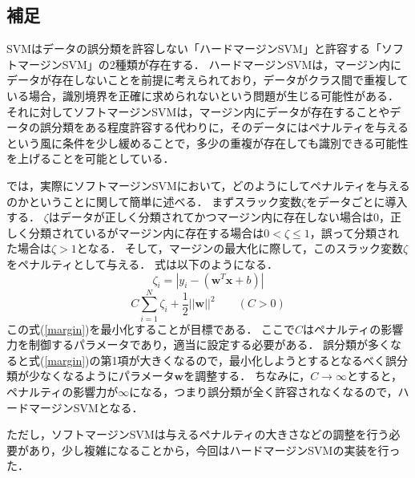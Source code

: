 \subsection*{補足}
SVMはデータの誤分類を許容しない「ハードマージンSVM」と許容する「ソフトマージンSVM」の2種類が存在する．
ハードマージンSVMは，マージン内にデータが存在しないことを前提に考えられており，データがクラス間で重複している場合，識別境界を正確に求められないという問題が生じる可能性がある．
それに対してソフトマージンSVMは，マージン内にデータが存在することやデータの誤分類をある程度許容する代わりに，そのデータにはペナルティを与えるという風に条件を少し緩めることで，多少の重複が存在しても識別できる可能性を上げることを可能としている．\par
では，実際にソフトマージンSVMにおいて，どのようにしてペナルティを与えるのかということに関して簡単に述べる．
まずスラック変数$\zeta$をデータごとに導入する．
$\zeta$はデータが正しく分類されてかつマージン内に存在しない場合は0，正しく分類されているがマージン内に存在する場合は$0<\zeta \leq 1$，誤って分類された場合は$\zeta>1$となる．
そして，マージンの最大化に際して，このスラック変数$\zeta$をペナルティとして与える．
式は以下のようになる．
\begin{equation}
    \zeta_i=|y_i-(\bm{w}^T\bm{x}+b)|
    \label{zeta}
\end{equation}
\begin{equation}
    C\sum_{i=1}^{N}\zeta_i+\frac{1}{2}||\bm{w}||^2 \qquad (C>0)
    \label{margin}
\end{equation}
この式(\ref{margin})を最小化することが目標である．
ここで$C$はペナルティの影響力を制御するパラメータであり，適当に設定する必要がある．
誤分類が多くなると式(\ref{margin})の第1項が大きくなるので，最小化しようとするとなるべく誤分類が少なくなるようにパラメータ$\bm{w}$を調整する．
ちなみに，$C \to \infty$とすると，ペナルティの影響力が$\infty$になる，つまり誤分類が全く許容されなくなるので，ハードマージンSVMとなる．\par
ただし，ソフトマージンSVMは与えるペナルティの大きさなどの調整を行う必要があり，少し複雑になることから，今回はハードマージンSVMの実装を行った．

